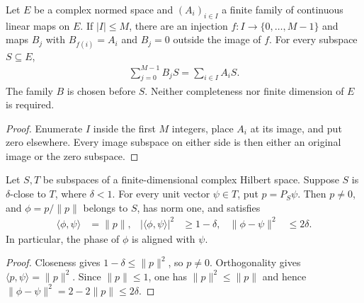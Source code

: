 \begin{theorem}
    \label{thm:operator_family_zero_extension}
    \leanok
    Let $E$ be a complex normed space and $(A_i)_{i\in I}$ a finite family
    of continuous linear maps on $E$. If $|I|\le M$, there are an injection
    $f:I\to\{0,\ldots,M-1\}$ and maps $B_j$ with $B_{f(i)}=A_i$ and
    $B_j=0$ outside the image of $f$. For every subspace $S\subseteq E$,
    \begin{align}
        \sum_{j=0}^{M-1}B_jS=\sum_{i\in I}A_iS.
    \end{align}
    The family $B$ is chosen before $S$. Neither completeness nor finite
    dimension of $E$ is required.
\end{theorem}
\begin{proof}\leanok
    Enumerate $I$ inside the first $M$ integers, place $A_i$ at its image,
    and put zero elsewhere. Every image subspace on either side is then
    either an original image or the zero subspace.
\end{proof}

\begin{lemma}
    \label{lem:close_normalized_projection}
    \leanok
    Let $S,T$ be subspaces of a finite-dimensional complex Hilbert space.
    Suppose $S$ is $\delta$-close to $T$, where $\delta<1$.
    For every unit vector $\psi\in T$, put $p=P_S\psi$.
    Then $p\ne0$, and $\phi=p/\|p\|$ belongs to $S$, has norm one, and satisfies
    \begin{align}
        \langle\phi,\psi\rangle&=\|p\|, &
        |\langle\phi,\psi\rangle|^2&\ge1-\delta, &
        \|\phi-\psi\|^2&\le2\delta.
    \end{align}
    In particular, the phase of $\phi$ is aligned with $\psi$.
\end{lemma}
\begin{proof}\leanok
    Closeness gives $1-\delta\le\|p\|^2$, so $p\ne0$.
    Orthogonality gives $\langle p,\psi\rangle=\|p\|^2$.
    Since $\|p\|\le1$, one has $\|p\|^2\le\|p\|$ and hence
    $\|\phi-\psi\|^2=2-2\|p\|\le2\delta$.
\end{proof}

